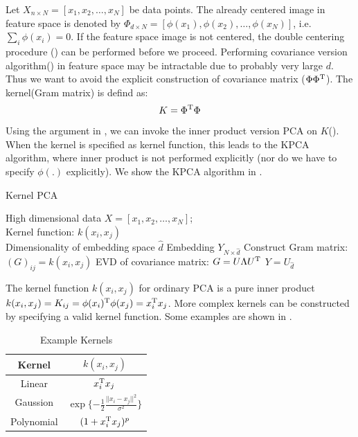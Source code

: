 Let $X_{n \times N} = [x_1, x_2, \ldots, x_N]$ be data points.
The already centered image in feature space is denoted by 
$\Phi_{d \times N} = [\phi(x_1), \phi(x_2), \ldots, \phi(x_N)]$, 
i.e. $ \sum_i\phi(x_i)=0 $. If the feature space image 
is not centered, the double centering procedure 
(\rsec{\ref{sec:proximity}}) can be performed 
before we proceed. Performing covariance 
version algorithm(\ralg{\ref{alg:pca_cov}}) in feature space 
may be intractable due to probably very large $ d $. Thus 
we want to avoid the explicit construction of covariance 
matrix ($ \Phi\Phi^\mathrm{T} $). 
The kernel(Gram matrix) is defind as:
\begin{equation}
	K = \Phi^\mathrm{T}\Phi 
\end{equation}
Using the argument in \rsec{\ref{sec:pca}}, we can 
invoke the inner product version PCA on $ K $(\ralg{\ref{alg:pca_in}}). 
When the kernel is specified as kernel function, 
this leads to the KPCA algorithm, where inner product
is not performed explicitly
(nor do we have to specify $ \phi(.) $ explicitly). 
We show the KPCA algorithm in 
\ralg{\ref{alg:kpac}}. 
 
\begin{algorithm}[htb]
	\caption{Kernel PCA}
	\label{alg:kpac}
	\begin{algorithmic}[1]
		\REQUIRE High dimensional data $X = [x_1, x_2, \ldots, x_N]$; \\
			Kernel function: $ k(x_i,x_j) $\\
			Dimensionality of embedding space $ \hat{d} $
		\ENSURE Embedding $ Y_{N \times \hat{d}} $
		\STATE Construct Gram matrix: $ (G)_{ij} = k(x_i,x_j)$
		\STATE EVD of covariance matrix: $ G = U \Lambda U^\mathrm{T} $
		\STATE $ Y = U_{\hat{d}} $
	\end{algorithmic}
\end{algorithm}

The kernel function $ k(x_i,x_j) $ for ordinary PCA is a pure 
inner product 
$ k(x_i,x_j) = K_{ij} = \phi(x_i)^\mathrm{T} \phi(x_j) = x_i^\mathrm{T}x_j $. 
More complex kernels can be constructed by specifying a valid 
kernel function. Some examples are shown in \rtbl{\ref{tbl:kernel_ex}}.

\begin{table}[htb]
	\centering
	\caption{Example Kernels}
	\label{tbl:kernel_ex}
	\begin{tabular}{c|c}
		\hline	
		Kernel & $ k(x_i,x_j) $ \\
		\hline	
		Linear & $ x_i^\mathrm{T}x_j $\\
		Gaussion & $ \exp\{ -\frac{1}{2}\frac{||x_i-x_j||^2}{\sigma^2} \} $ \\
		Polynomial & $ (1 + x_i^\mathrm{T}x_j)^p $ \\
		\hline
	\end{tabular}
\end{table}

